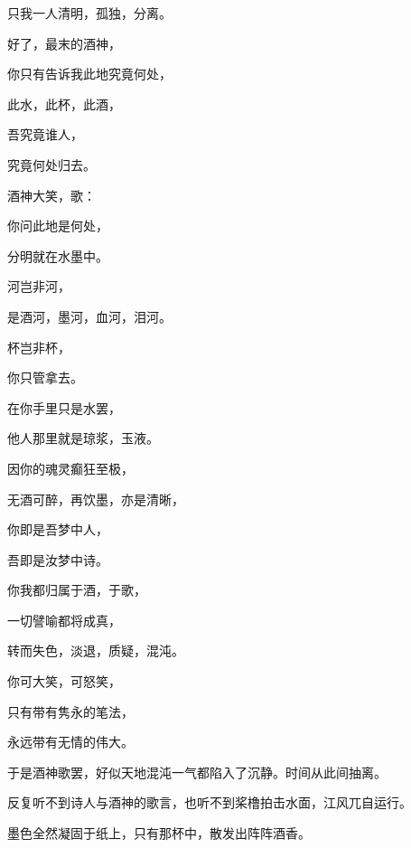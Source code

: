 \documentclass[UTF8]{article}
\begin{document}
\par 只我一人清明，孤独，分离。
\par 好了，最末的酒神，
\par 你只有告诉我此地究竟何处，
\par 此水，此杯，此酒，
\par 吾究竟谁人，
\par 究竟何处归去。
\\[0.6cm]
\par 酒神大笑，歌：
\\[0.6cm]
\par 你问此地是何处，
\par 分明就在水墨中。
\par 河岂非河，
\par 是酒河，墨河，血河，泪河。
\par 杯岂非杯，
\par 你只管拿去。
\par 在你手里只是水罢，
\par 他人那里就是琼浆，玉液。
\par 因你的魂灵癫狂至极，
\par 无酒可醉，再饮墨，亦是清晰，
\par 你即是吾梦中人，
\par 吾即是汝梦中诗。
\par 你我都归属于酒，于歌，
\par 一切譬喻都将成真，
\par 转而失色，淡退，质疑，混沌。
\par 你可大笑，可怒笑，
\par 只有带有隽永的笔法，
\par 永远带有无情的伟大。
\\[0.6cm]
\par 于是酒神歌罢，好似天地混沌一气都陷入了沉静。时间从此间抽离。
\par 反复听不到诗人与酒神的歌言，也听不到桨橹拍击水面，江风兀自运行。
\par 墨色全然凝固于纸上，只有那杯中，散发出阵阵酒香。
\end{document}
